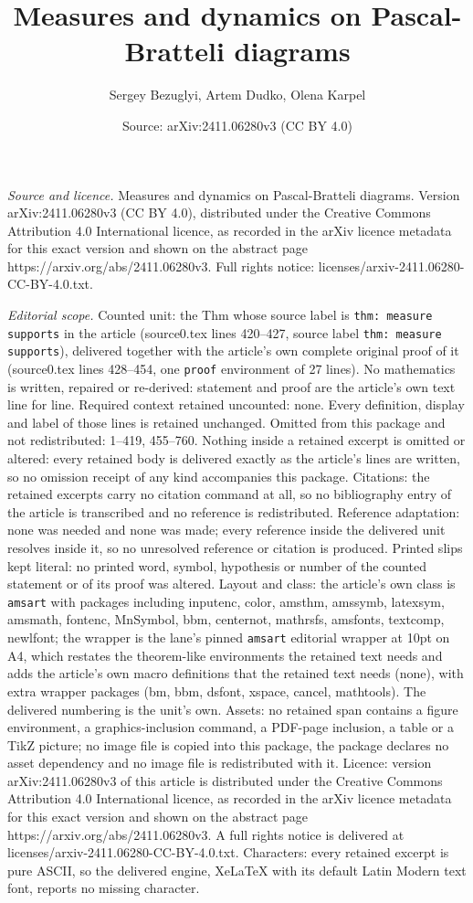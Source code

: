 \documentclass[10pt,a4paper]{amsart}
\title[Measures and dynamics on Pascal-Bratteli diagrams]{Measures and dynamics on Pascal-Bratteli diagrams}
\author{Sergey Bezuglyi, Artem Dudko, Olena Karpel}
\date{Source: arXiv:2411.06280v3 (CC BY 4.0)}
\begin{document}
\maketitle

\noindent\emph{Source and licence.} Measures and dynamics on Pascal-Bratteli diagrams. Version arXiv:2411.06280v3 (CC BY 4.0), distributed under the Creative Commons Attribution 4.0 International licence, as recorded in the arXiv licence metadata for this exact version and shown on the abstract page https://arxiv.org/abs/2411.06280v3. Full rights notice: licenses/arxiv-2411.06280-CC-BY-4.0.txt.\par\smallskip

\noindent\textit{Editorial scope.} Counted unit: the Thm whose source label is \texttt{thm: measure supports} in the article (source0.tex lines 420--427, source label \texttt{thm: measure supports}), delivered together with the article's own complete original proof of it (source0.tex lines 428--454, one \texttt{proof} environment of 27 lines). No mathematics is written, repaired or re-derived: statement and proof are the article's own text line for line. Required context retained uncounted: none. Every definition, display and label of those lines is retained unchanged. Omitted from this package and not redistributed: 1--419, 455--760. Nothing inside a retained excerpt is omitted or altered: every retained body is delivered exactly as the article's lines are written, so no omission receipt of any kind accompanies this package. Citations: the retained excerpts carry no citation command at all, so no bibliography entry of the article is transcribed and no reference is redistributed. Reference adaptation: none was needed and none was made; every reference inside the delivered unit resolves inside it, so no unresolved reference or citation is produced. Printed slips kept literal: no printed word, symbol, hypothesis or number of the counted statement or of its proof was altered. Layout and class: the article's own class is \texttt{amsart} with packages including inputenc, color, amsthm, amssymb, latexsym, amsmath, fontenc, MnSymbol, bbm, centernot, mathrsfs, amsfonts, textcomp, newlfont; the wrapper is the lane's pinned \texttt{amsart} editorial wrapper at 10pt on A4, which restates the theorem-like environments the retained text needs and adds the article's own macro definitions that the retained text needs (none), with extra wrapper packages (bm, bbm, dsfont, xspace, cancel, mathtools). The delivered numbering is the unit's own. Assets: no retained span contains a figure environment, a graphics-inclusion command, a PDF-page inclusion, a table or a TikZ picture; no image file is copied into this package, the package declares no asset dependency and no image file is redistributed with it. Licence: version arXiv:2411.06280v3 of this article is distributed under the Creative Commons Attribution 4.0 International licence, as recorded in the arXiv licence metadata for this exact version and shown on the abstract page https://arxiv.org/abs/2411.06280v3. A full rights notice is delivered at licenses/arxiv-2411.06280-CC-BY-4.0.txt. Characters: every retained excerpt is pure ASCII, so the delivered engine, XeLaTeX with its default Latin Modern text font, reports no missing character.
\end{document}
